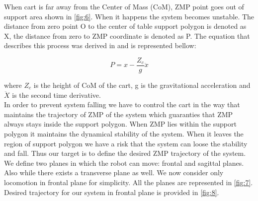 \documentclass[12pt,a4paper]{report}
\begin{document}
			When cart is far away from the Center of Mass (CoM), ZMP point goes out of support area shown in \cref{fig:6}. When it happens the system becomes unstable. The distance from zero point O to the center of table support polygon is denoted as X, the distance from zero to ZMP coordinate is denoted as P.
			The equation that describes this process was derived in \cite{kajita2003biped} and is represented bellow:
			
			\begin{equation}\label{eq:eqv1}
				P = x -\dfrac{Z_c}{g} \ddot{x}
			\end{equation}
			
			where $Z_c$ is the height of CoM of the cart, g is the gravitational acceleration and $\ddot{X}$ is the second time derivative.\\
			In order to prevent system falling we have to control the cart in the way that maintains the trajectory of ZMP of the system which guaranties that ZMP always stays inside the support polygon. When ZMP lies within the support polygon it maintains the dynamical stability of the system. When it leaves the region of support polygon we have a risk that the system can loose the stability and fall. Thus our target is to define the desired ZMP trajectory of the system. We define two planes in which the robot can move: frontal and sagittal planes. Also while there exists a transverse plane as well. We now consider only locomotion in frontal plane for simplicity. All the planes are represented in \cref{fig:7}. Desired trajectory for our system in frontal plane is provided in \cref{fig:8}.
			
\end{document}
